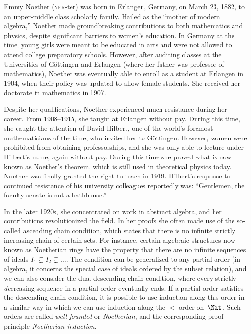 \documentclass[../../../include/open-logic-section]{subfiles}
\begin{document}


Emmy Noether (\textsc{ner}-ter) was born in Erlangen, Germany, on
March 23, 1882, to an upper-middle class scholarly family. Hailed as
the ``mother of modern algebra,'' Noether made groundbreaking
contributions to both mathematics and physics, despite significant
barriers to women's education. In Germany at the time, young girls
were meant to be educated in arts and were not allowed to attend
college preparatory schools.  However, after auditing classes at the
Universities of G\"{o}ttingen and Erlangen (where her father was
professor of mathematics), Noether was eventually able to enroll as a
student at Erlangen in 1904, when their policy was updated to allow
female students. She received her doctorate in mathematics in 1907.

Despite her qualifications, Noether experienced much resistance during
her career. From 1908--1915, she taught at Erlangen without
pay. During this time, she caught the attention of David Hilbert, one
of the world's foremost mathematicians of the time, who invited her to
G\"{o}ttingen. However, women were prohibited from obtaining
professorships, and she was only able to lecture under Hilbert's name,
again without pay. During this time she proved what is now known as
Noether's theorem, which is still used in theoretical physics
today. Noether was finally granted the right to teach in 1919.
Hilbert's response to continued resistance of his university
colleagues reportedly was: ``Gentlemen, the faculty senate is not a
bathhouse.''

In the later 1920s, she concentrated on work in abstract algebra, and
her contributions revolutionized the field.  In her proofs she often
made use of the so-called ascending chain condition, which states that
there is no infinite strictly increasing chain of certain sets. For
instance, certain algebraic structures now known as Noetherian rings
have the property that there are no infinite sequences of ideals $I_1
\subsetneq I_2 \subsetneq \dots$.  The condition can be generalized to
any partial order (in algebra, it concerns the special case of ideals
ordered by the subset relation), and we can also consider the dual
descending chain condition, where every strictly \emph{de}creasing
sequence in a partial order eventually ends.  If a partial order
satisfies the descending chain condition, it is possible to use
induction along this order in a similar way in which we can use
induction along the $<$ order on~$\Nat$.  Such orders are called
\emph{well-founded} or \emph{Noetherian}, and the corresponding proof
principle \emph{Noetherian induction}.
\end{document}

